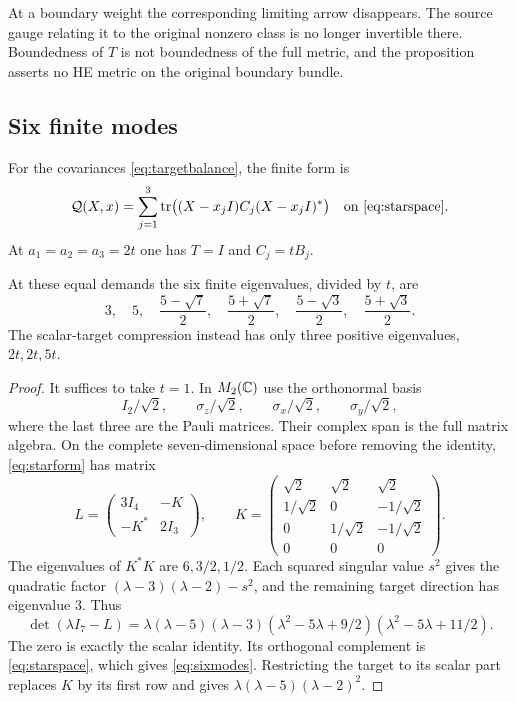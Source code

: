 At a boundary weight the corresponding limiting arrow disappears.
The source gauge relating it to the original nonzero class is no
longer invertible there. Boundedness of $T$ is not boundedness of
the full metric, and the proposition asserts no HE metric on the
original boundary bundle.

\subsection{Six finite modes}
For the covariances \eqref{eq:targetbalance}, the finite form is
\begin{equation}\label{eq:starform}
\mathcal Q(X,x)=\sum_{j=1}^3
\operatorname{tr}\bigl((X-x_jI)C_j(X-x_jI)^*\bigr)
\quad\text{on \eqref{eq:starspace}}.
\end{equation}
At $a_1=a_2=a_3=2t$ one has $T=I$ and $C_j=tB_j$.

\begin{proposition}\label{prop:sixmodes}
At these equal demands the six finite eigenvalues, divided by $t$,
are
\begin{equation}\label{eq:sixmodes}
3,\quad5,\quad\frac{5-\sqrt7}{2},\quad\frac{5+\sqrt7}{2},\quad
\frac{5-\sqrt3}{2},\quad\frac{5+\sqrt3}{2}.
\end{equation}
The scalar-target compression instead has only three positive
eigenvalues, $2t,2t,5t$.
\end{proposition}

\begin{proof}
It suffices to take $t=1$. In $M_2(\mathbb C)$ use the orthonormal basis
\[
I_2/\sqrt2,\qquad\sigma_z/\sqrt2,\qquad
\sigma_x/\sqrt2,\qquad\sigma_y/\sqrt2,
\]
where the last three are the Pauli matrices. Their complex span
is the full matrix algebra. On the complete seven-dimensional
space before removing the identity, \eqref{eq:starform} has matrix
\begin{equation}\label{eq:staroperator}
L=\begin{pmatrix}3I_4&-K\\-K^*&2I_3\end{pmatrix},\qquad
K=\begin{pmatrix}
\sqrt2&\sqrt2&\sqrt2\\
1/\sqrt2&0&-1/\sqrt2\\
0&1/\sqrt2&-1/\sqrt2\\
0&0&0
\end{pmatrix}.
\end{equation}
The eigenvalues of $K^*K$ are $6,3/2,1/2$.
Each squared singular value $s^2$ gives the quadratic factor
$(\lambda-3)(\lambda-2)-s^2$, and the remaining target
direction has eigenvalue $3$. Thus
\[
\det(\lambda I_7-L)=\lambda(\lambda-5)(\lambda-3)
(\lambda^2-5\lambda+9/2)(\lambda^2-5\lambda+11/2).
\]
The zero is exactly the scalar identity. Its orthogonal complement
is \eqref{eq:starspace}, which gives \eqref{eq:sixmodes}.
Restricting the target to its scalar part replaces $K$ by its
first row and gives $\lambda(\lambda-5)(\lambda-2)^2$.
\end{proof}

